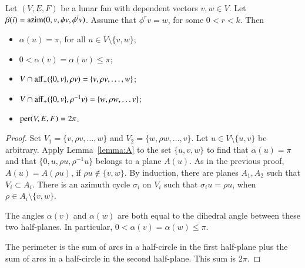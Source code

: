 \begin{lemma}\label{lemma:lunar}
Let $(V,E,F)$ be a lunar fan with dependent vectors $v,w\in V$.  
Let $\beta(i) = {\operatorname{azim}}(0,v,\phi v,\phi^i v)$.  Assume that $\phi^r v = w$, for
some $0< r < k$.
Then
\begin{itemize}
\item $\alpha(u) = \pi$, for all $u\in V\setminus \{v,w\}$; \vspace{3pt}
\item $0< \alpha(v) = \alpha(w)\le \pi$; \vspace{3pt}
\item $V\cap {\operatorname{aff}}_+(\{0,v\},\rho v) = \{v,\rho v,\ldots, w\}$; \vspace{3pt}
\item $V \cap {\operatorname{aff}}_+(\{0,v\},\rho^{-1} v) = \{w,\rho w,\ldots v\}$;  \vspace{3pt}
\item ${\operatorname{per}}(V,E,F) = 2\pi$.
\end{itemize}
\end{lemma}

\begin{proof}   Set $V_1 = \{v,\rho v,\ldots,w\}$ and $V_2 = \{w,\rho w,\ldots,v\}$. 
Let $u\in V\setminus\{u,v\}$ be arbitrary.
Apply Lemma~\ref{lemma:A} to the set $\{u,v,w\}$ to find that $\alpha(u)=\pi$ and
that $\{0,u,\rho u,\rho^{-1} u\}$ belongs to a plane $A(u)$.   As in the previous proof, $A(u) = A(\rho u)$,
if $\rho u\not\in \{v,w\}$.  By induction, there are planes $A_1, A_2$ such that $V_i\subset A_i$.  There is
an azimuth cycle $\sigma_i$ on $V_i$ such that $\sigma_i u = \rho u$, when $\rho \in A_i\setminus \{v,w\}$.  

The angles $\alpha(v)$ and $\alpha(w)$ are both equal to the dihedral angle between these two half-planes.  In particular, $0<\alpha(v)=\alpha(w)\le\pi$.
%

The perimeter is the sum of arcs in a half-circle in the first half-plane plus
the sum of arcs in a half-circle in the second half-plane. This sum is $2\pi$.
\end{proof}




